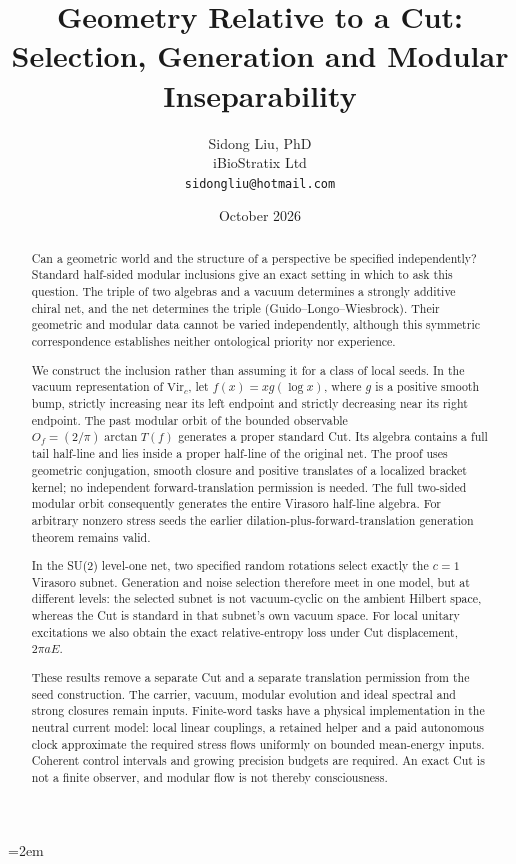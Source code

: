 \documentclass[12pt]{article}
\title{%
  \textbf{Geometry Relative to a Cut:}\\
  \textbf{Selection, Generation and Modular Inseparability}%
}
\author{
  Sidong Liu, PhD \\
  \small iBioStratix Ltd \\
  \small \texttt{sidongliu@hotmail.com}
}
\date{October 2026}
\theoremstyle{definition}
\theoremstyle{remark}
\begin{document}
\emergencystretch=2em
\raggedbottom
{}

\maketitle

\begin{abstract}
Can a geometric world and the structure of a perspective be specified independently?
Standard half-sided modular inclusions give an exact setting in which to ask this
question. The triple of two algebras and a vacuum determines a strongly additive
chiral net, and the net determines the triple (Guido--Longo--Wiesbrock). Their
geometric and modular data cannot be varied independently, although this symmetric
correspondence establishes neither ontological priority nor experience.

We construct the inclusion rather than assuming it for a class of local seeds.
In the vacuum representation of \(\mathrm{Vir}_c\), let
\(f(x)=xg(\log x)\), where \(g\) is a positive smooth bump, strictly increasing
near its left endpoint and strictly decreasing near its right endpoint.
The past modular orbit of the bounded observable
\(O_f=(2/\pi)\arctan T(f)\) generates a proper standard Cut. Its algebra contains
a full tail half-line and lies inside a proper half-line of the original net.
The proof uses geometric conjugation, smooth closure and positive translates
of a localized bracket kernel; no independent forward-translation permission
is needed. The full two-sided modular orbit consequently generates the entire
Virasoro half-line algebra. For arbitrary nonzero stress seeds the earlier
dilation-plus-forward-translation generation theorem remains valid.

In the SU(2) level-one net, two specified random rotations select exactly the
\(c=1\) Virasoro subnet. Generation and noise selection therefore meet in one
model, but at different levels: the selected subnet is not vacuum-cyclic on the
ambient Hilbert space, whereas the Cut is standard in that subnet's own vacuum
space. For local unitary excitations we also obtain the exact relative-entropy
loss under Cut displacement, \(2\pi aE\).

These results remove a separate Cut and a separate translation permission from
the seed construction. The carrier, vacuum, modular evolution and ideal spectral
and strong closures remain inputs. Finite-word tasks have a physical
implementation in the neutral current model: local linear couplings,
a retained helper and a paid autonomous clock approximate the required
stress flows uniformly on bounded mean-energy inputs. Coherent control
intervals and growing precision budgets are required. An exact Cut is
not a finite observer, and modular flow is not thereby consciousness.
\end{abstract}
\end{document}
